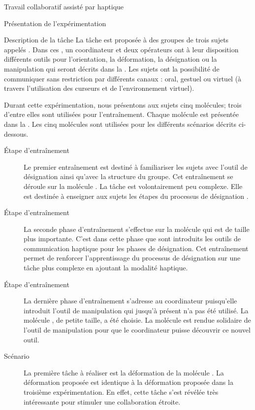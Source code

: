 \documentclass[myfrancais,ngerman,english,french]{mythesis}
\begin{document}
\begin{mychapter}{Travail collaboratif assisté par haptique}
\begin{mysection}{Présentation de l'expérimentation}
\begin{mysubsection}{Description de la tâche}
				La tâche est proposée à des groupes de trois sujets appelés .
				Dans ces , un \og coordinateur \fg et deux \og opérateurs \fg ont à leur disposition différents outils pour l'orientation, la déformation, la désignation ou la manipulation qui seront décrits dans la .
				Les sujets ont la possibilité de communiquer sans restriction par différents canaux : oral, gestuel ou virtuel (à travers l'utilisation des curseurs et de l'environnement virtuel).

				Durant cette expérimentation, nous présentons aux sujets cinq molécules; trois d'entre elles sont utilisées pour l'entraînement.
				Chaque molécule est présentée dans la .
				Les cinq molécules sont utilisées pour les différents scénarios décrits ci-dessous.
				\begin{description}
					\item[Étape d'entraînement~]
						Le premier entraînement est destiné à familiariser les sujets avec l'outil de désignation ainsi qu'avec la structure du groupe.
						Cet entraînement se déroule sur la molécule \myTRPCAGE.
						La tâche est volontairement peu complexe.
						Elle est destinée à enseigner aux sujets les étapes du processus de désignation .
					\item[Étape d'entraînement~]
						La seconde phase d'entraînement s'effectue sur la molécule \myPrion qui est de taille plus importante.
						C'est dans cette phase que sont introduits les outils de communication haptique pour les phases de désignation.
						Cet entraînement permet de renforcer l'apprentissage du processus de désignation sur une tâche plus complexe en ajoutant la modalité haptique.
					\item[Étape d'entraînement~]
						La dernière phase d'entraînement s'adresse au coordinateur puisqu'elle introduit l'outil de manipulation qui jusqu'à présent n'a pas été utilisé.
						La molécule \myTRPZIPPER, de petite taille, a été choisie.
						La molécule est rendue solidaire de l'outil de manipulation pour que le coordinateur puisse découvrir ce nouvel outil.
					\item[Scénario~]
						La première tâche à réaliser est la déformation de la molécule \myUbiquitin.
						La déformation proposée est identique à la déformation proposée dans la troisième expérimentation.
						En effet, cette tâche s'est révélée très intéressante pour stimuler une collaboration étroite.

\end{description}
\end{mysubsection}
\end{mysection}
\end{mychapter}
\end{document}
